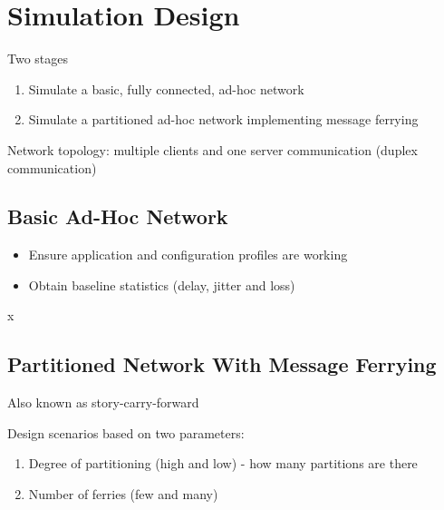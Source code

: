 \chapter{Simulation Design} 

Two stages

\begin{enumerate}
\item Simulate a basic, fully connected, ad-hoc network
\item Simulate a partitioned ad-hoc network implementing message ferrying
\end{enumerate}

Network topology: multiple clients and one server communication (duplex communication)

\section{Basic Ad-Hoc Network}

\begin{itemize}
\item Ensure application and configuration profiles are working
\item Obtain baseline statistics (delay, jitter and loss)
\end{itemize}
x
\section{Partitioned Network With Message Ferrying}

Also known as story-carry-forward

Design scenarios based on two parameters:

\begin{enumerate}
\item Degree of partitioning (high and low) - how many partitions are there
\item Number of ferries (few and many)
\end{enumerate}